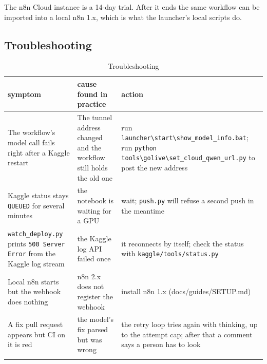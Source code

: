 The n8n Cloud instance is a 14-day trial. After it ends the same workflow can be imported into a local n8n 1.x, which is what the launcher's local scripts do.

\subsection{Troubleshooting}

\begingroup\small
\begin{longtable}{>{\raggedright\arraybackslash}p{0.291\dimexpr\linewidth-6\tabcolsep\relax}>{\raggedright\arraybackslash}p{0.291\dimexpr\linewidth-6\tabcolsep\relax}>{\raggedright\arraybackslash}p{0.418\dimexpr\linewidth-6\tabcolsep\relax}}
\toprule
\rowcolor{gray!14}\textbf{symptom} & \textbf{cause found in practice} & \textbf{action} \\
\midrule
\endhead
\bottomrule
\endfoot
\endlastfoot
The workflow's model call fails right after a Kaggle restart & The tunnel address changed and the workflow still holds the old one & run \texttt{launcher\textbackslash{}start\textbackslash{}show\_\allowbreak{}model\_\allowbreak{}info.\allowbreak{}bat}; run \texttt{python tools\textbackslash{}golive\textbackslash{}set\_\allowbreak{}cloud\_\allowbreak{}qwen\_\allowbreak{}url.\allowbreak{}py} to post the new address \\
Kaggle status stays \texttt{QUEUED} for several minutes & the notebook is waiting for a GPU & wait; \texttt{push.\allowbreak{}py} will refuse a second push in the meantime \\
\texttt{watch\_\allowbreak{}deploy.\allowbreak{}py} prints \texttt{500 Server Error} from the Kaggle log stream & the Kaggle log API failed once & it reconnects by itself; check the status with \texttt{kaggle/\allowbreak{}tools/\allowbreak{}status.\allowbreak{}py} \\
Local n8n starts but the webhook does nothing & n8n 2.x does not register the webhook & install n8n 1.x (docs/\allowbreak{}guides/\allowbreak{}SETUP.md) \\
A fix pull request appears but CI on it is red & the model's fix parsed but was wrong & the retry loop tries again with thinking, up to the attempt cap; after that a comment says a person has to look \\
\bottomrule
\caption{Troubleshooting}\label{tab:10deploy-2}\\
\end{longtable}
\endgroup
